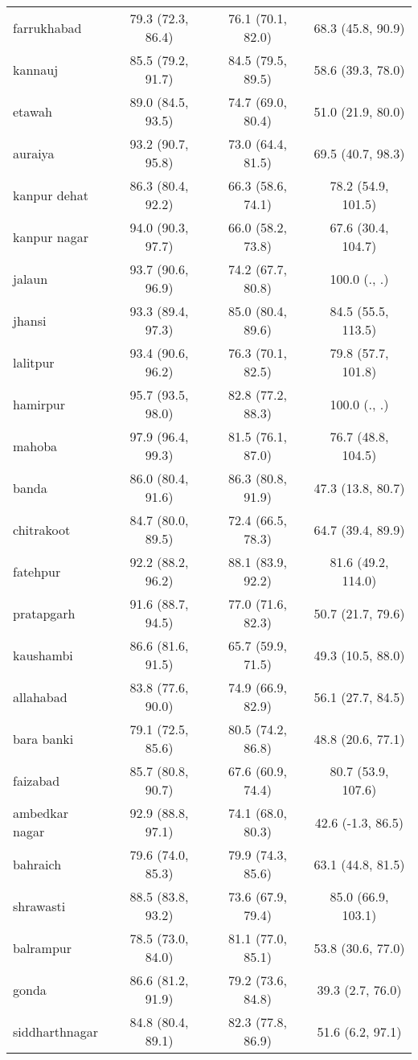 \begin{tabular}{lccc}
farrukhabad&79.3 (72.3, 86.4)&76.1 (70.1, 82.0)&68.3 (45.8, 90.9)\\
kannauj&85.5 (79.2, 91.7)&84.5 (79.5, 89.5)&58.6 (39.3, 78.0)\\
etawah&89.0 (84.5, 93.5)&74.7 (69.0, 80.4)&51.0 (21.9, 80.0)\\
auraiya&93.2 (90.7, 95.8)&73.0 (64.4, 81.5)&69.5 (40.7, 98.3)\\
kanpur dehat&86.3 (80.4, 92.2)&66.3 (58.6, 74.1)&78.2 (54.9, 101.5)\\
kanpur nagar&94.0 (90.3, 97.7)&66.0 (58.2, 73.8)&67.6 (30.4, 104.7)\\
jalaun&93.7 (90.6, 96.9)&74.2 (67.7, 80.8)&100.0 (., .)\\
jhansi&93.3 (89.4, 97.3)&85.0 (80.4, 89.6)&84.5 (55.5, 113.5)\\
lalitpur&93.4 (90.6, 96.2)&76.3 (70.1, 82.5)&79.8 (57.7, 101.8)\\
hamirpur&95.7 (93.5, 98.0)&82.8 (77.2, 88.3)&100.0 (., .)\\
mahoba&97.9 (96.4, 99.3)&81.5 (76.1, 87.0)&76.7 (48.8, 104.5)\\
banda&86.0 (80.4, 91.6)&86.3 (80.8, 91.9)&47.3 (13.8, 80.7)\\
chitrakoot&84.7 (80.0, 89.5)&72.4 (66.5, 78.3)&64.7 (39.4, 89.9)\\
fatehpur&92.2 (88.2, 96.2)&88.1 (83.9, 92.2)&81.6 (49.2, 114.0)\\
pratapgarh&91.6 (88.7, 94.5)&77.0 (71.6, 82.3)&50.7 (21.7, 79.6)\\
kaushambi&86.6 (81.6, 91.5)&65.7 (59.9, 71.5)&49.3 (10.5, 88.0)\\
allahabad&83.8 (77.6, 90.0)&74.9 (66.9, 82.9)&56.1 (27.7, 84.5)\\
bara banki&79.1 (72.5, 85.6)&80.5 (74.2, 86.8)&48.8 (20.6, 77.1)\\
faizabad&85.7 (80.8, 90.7)&67.6 (60.9, 74.4)&80.7 (53.9, 107.6)\\
ambedkar nagar&92.9 (88.8, 97.1)&74.1 (68.0, 80.3)&42.6 (-1.3, 86.5)\\
bahraich&79.6 (74.0, 85.3)&79.9 (74.3, 85.6)&63.1 (44.8, 81.5)\\
shrawasti&88.5 (83.8, 93.2)&73.6 (67.9, 79.4)&85.0 (66.9, 103.1)\\
balrampur&78.5 (73.0, 84.0)&81.1 (77.0, 85.1)&53.8 (30.6, 77.0)\\
gonda&86.6 (81.2, 91.9)&79.2 (73.6, 84.8)&39.3 (2.7, 76.0)\\
siddharthnagar&84.8 (80.4, 89.1)&82.3 (77.8, 86.9)&51.6 (6.2, 97.1)\\

\end{tabular}
